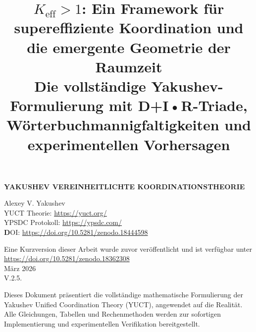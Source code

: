 \documentclass[11pt,a4paper]{article}
\title{$K_{\mathrm{eff}} > 1$: Ein Framework für supereffiziente Koordination und die emergente Geometrie der Raumzeit \\ 
	\large Die vollständige Yakushev-Formulierung mit D+I•R-Triade, Wörterbuchmannigfaltigkeiten und experimentellen Vorhersagen}
\begin{document}
	\begin{titlepage}
		\begin{center}
			\vspace*{3cm}
			\Huge\textbf{YAKUSHEV VEREINHEITLICHTE KOORDINATIONSTHEORIE\\
			}
			
			
			
			\vspace{2cm}
			\Large
			Alexey V. Yakushev\\
			\vspace{2cm}
			YUCT Theorie: \url{https://yuct.org/}\\
			YPSDC Protokoll: \url{https://ypsdc.com/}\\
			
			
			\vspace{2cm}
			\textbf DOI: \url{https://doi.org/10.5281/zenodo.18444598}\\
			
			\vspace{1cm}
			
			\vspace{0cm}
			\large 
			Eine Kurzversion dieser Arbeit wurde zuvor veröffentlicht und ist verfügbar unter\\ \url{https://doi.org/10.5281/zenodo.18362308}\\
			\vspace{1cm}
			März 2026 \\ \large V.2.5.
			
			\vfill
			\normalsize
			Dieses Dokument präsentiert die vollständige mathematische Formulierung der Yakushev Unified Coordination Theory (YUCT), angewendet auf die Realität. Alle Gleichungen, Tabellen und Rechenmethoden werden zur sofortigen Implementierung und experimentellen Verifikation bereitgestellt.
		\end{center}
	\end{titlepage}
	
	
	
	\maketitle
	
\end{document}
